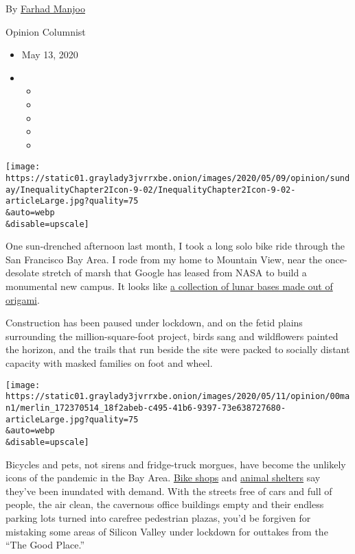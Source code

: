 By \href{https://www.nytimes3xbfgragh.onion/by/farhad-manjoo}{Farhad
Manjoo}

Opinion Columnist

\begin{itemize}
\item
  May 13, 2020
\item
  \begin{itemize}
  \item
  \item
  \item
  \item
  \item
  \end{itemize}
\end{itemize}

\texttt{[image: https://static01.graylady3jvrrxbe.onion/images/2020/05/09/opinion/sunday/InequalityChapter2Icon-9-02/InequalityChapter2Icon-9-02-articleLarge.jpg?quality=75\\\&auto=webp\\\&disable=upscale]}

One sun-drenched afternoon last month, I took a long solo bike ride
through the San Francisco Bay Area. I rode from my home to Mountain
View, near the once-desolate stretch of marsh that Google has leased
from NASA to build a monumental new campus. It looks like
\href{https://www.dezeen.com/2019/08/27/google-hq-big-heatherwick-the-111th/}{a
collection of lunar bases made out of origami}.

Construction has been paused under lockdown, and on the fetid plains
surrounding the million-square-foot project, birds sang and wildflowers
painted the horizon, and the trails that run beside the site were packed
to socially distant capacity with masked families on foot and wheel.

\texttt{[image: https://static01.graylady3jvrrxbe.onion/images/2020/05/11/opinion/00man1/merlin\_172370514\_18f2abeb-c495-41b6-9397-73e638727680-articleLarge.jpg?quality=75\\\&auto=webp\\\&disable=upscale]}

Bicycles and pets, not sirens and fridge-truck morgues, have become the
unlikely icons of the pandemic in the Bay Area.
\href{https://www.sfexaminer.com/the-city/san-francisco-bike-shops-are-booming-during-the-pandemic/}{Bike
shops} and
\href{https://sfpublicpress.org/news/2020-04/want-to-foster-a-dog-get-on-the-waitlist-as-demand-soars-at-bay-area-shelters}{animal
shelters} say they've been inundated with demand. With the streets free
of cars and full of people, the air clean, the cavernous office
buildings empty and their endless parking lots turned into carefree
pedestrian plazas, you'd be forgiven for mistaking some areas of Silicon
Valley under lockdown for outtakes from the ``The Good Place.''

